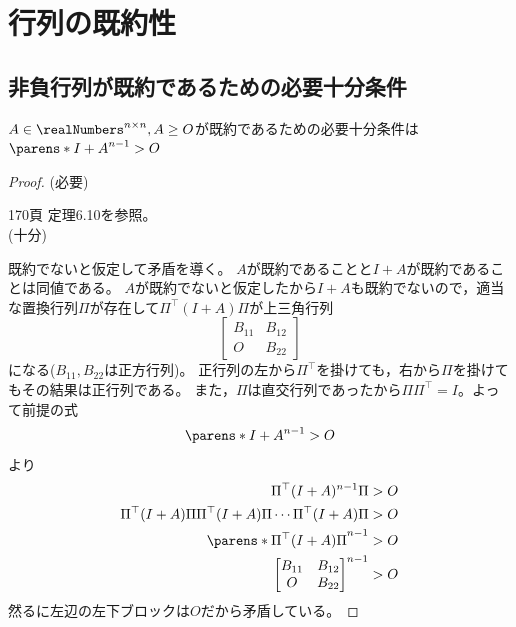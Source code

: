 \chapter{行列の既約性}
    \section{非負行列が既約であるための必要十分条件}
        \begin{shadebox}
            $A\in\realNumbers^{n\times n},A\geq O$が既約であるための必要十分条件は$\parens*{I+A}^{n-1}>O$
        \end{shadebox}
        \begin{proof}
            (必要)
            \par
            \cite{システム線形代数} 170頁 定理6.10を参照。\\
            (十分)
            \par
            既約でないと仮定して矛盾を導く。
            $A$が既約であることと$I+A$が既約であることは同値である。
            $A$が既約でないと仮定したから$I+A$も既約でないので，適当な置換行列$\Pi$が存在して$\Pi^\top (I+A)\Pi$が上三角行列
            \[
                \begin{bmatrix}
                    B_{11} & B_{12}\\
                    O & B_{22}
                \end{bmatrix}
            \]
            になる($B_{11},B_{22}$は正方行列)。
            正行列の左から$\Pi^\top$を掛けても，右から$\Pi$を掛けてもその結果は正行列である。
            また，$\Pi$は直交行列であったから$\Pi\Pi^\top=I$。よって前提の式
            \[\parens*{I+A}^{n-1}>O\]
            より
            \begin{align*}
                \Pi^\top(I+A)^{n-1}\Pi &> O\\
                \Pi^\top(I+A)\Pi\Pi^\top(I+A)\Pi\dotsm\Pi^\top(I+A)\Pi &> O\\
                \parens*{\Pi^\top(I+A)\Pi}^{n-1}&> O\\
                \begin{bmatrix}
                    B_{11} & B_{12}\\
                    O & B_{22}
                \end{bmatrix}^{n-1} &> O
            \end{align*}
            然るに左辺の左下ブロックは$O$だから矛盾している。
        \end{proof}